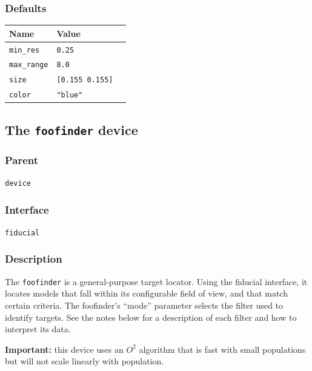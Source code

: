 \documentclass[11pt,twoside]{report}
\begin{document}
\subsubsection*{Defaults}
\begin{tabularx}{\columnwidth}{llX}
\hline
Name & Value\\
\hline
\verb'min_res' & \verb'0.25'\\
\verb'max_range' & \verb'8.0' \\
\verb'size' & \verb'[0.155 0.155]'\\
\verb'color' & \verb'"blue"' \\
\hline
\end{tabularx}


\newpage
\subsection{The {\tt foofinder} device}

\subsubsection*{Parent}
{\tt device}

\subsubsection*{Interface}
{\tt fiducial}

\subsubsection*{Description}

The \verb'foofinder' is a general-purpose target locator. Using the
fiducial interface, it locates models that fall within its
configurable field of view, and that match certain criteria. The
foofinder's ``mode'' parameter selects the filter used to identify
targets. See the notes below for a description of each filter and how
to interpret its data.

{\bf Important: } this device uses an $O^2$ algorithm that is fast
with small populations but will not scale linearly with population.
\end{document}
